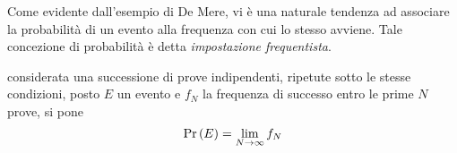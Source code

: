 \documentclass{subfiles}
\begin{document}
Come evidente dall'esempio di De Mere, vi è una naturale tendenza ad associare la probabilità di un evento alla frequenza con cui lo stesso avviene.
Tale concezione di probabilità è detta \emph{impostazione frequentista}.
\begin{Definition*}
    considerata una successione di prove indipendenti, ripetute sotto le stesse condizioni,
    posto \(E\) un evento e \(f_{N}\) la frequenza di successo entro le prime \(N\) prove, si pone
    \[
        \Prob{E} = \Lim{N}{\infty}{f_{N}}
    \]
\end{Definition*}
\end{document}
